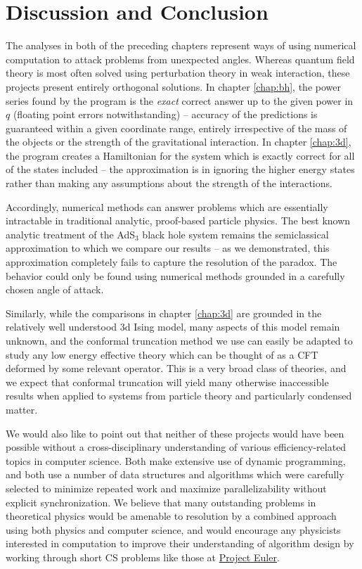 \chapter{Discussion and Conclusion}
\label{chap:conclusion}

The analyses in both of the preceding chapters represent ways of using numerical
computation to attack problems from unexpected angles. Whereas quantum field 
theory is most often solved using perturbation theory in weak interaction, these
projects present entirely orthogonal solutions. In chapter \ref{chap:bh}, the 
power series found by the program is the \emph{exact} correct answer up to 
the given power in $q$ (floating point errors notwithstanding) -- accuracy of 
the predictions is guaranteed within a given coordinate range, entirely 
irrespective of the mass of the objects or the strength of the gravitational 
interaction. In chapter \ref{chap:3d}, the program creates a Hamiltonian for the 
system which is exactly correct for all of the states included -- the 
approximation is in ignoring the higher energy states rather than making any 
assumptions about the strength of the interactions.

Accordingly, numerical methods can answer problems which are essentially 
intractable in traditional analytic, proof-based particle physics. The best
known analytic treatment of the AdS$_3$ black hole system remains the 
semiclassical approximation to which we compare our results -- as we 
demonstrated, this approximation completely fails to capture the resolution of
the paradox. The behavior could only be found using numerical methods grounded
in a carefully chosen angle of attack.

Similarly, while the comparisons in chapter \ref{chap:3d} are grounded in the 
relatively well understood 3d Ising model, many aspects of this model remain 
unknown, and the conformal truncation method we use can easily be adapted to 
study any low energy effective theory which can be thought of as a CFT deformed 
by some relevant operator. This is a very broad class of theories, and we expect 
that conformal truncation will yield many otherwise inaccessible results when 
applied to systems from particle theory and particularly condensed matter.

We would also like to point out that neither of these projects would have been
possible without a cross-disciplinary understanding of various 
efficiency-related topics in computer science. Both make extensive use of 
dynamic programming, and both use a number of data structures and algorithms 
which were carefully selected to minimize repeated work and maximize 
parallelizability without explicit synchronization. We believe that many
outstanding problems in theoretical physics would be amenable to resolution by
a combined approach using both physics and computer science, and would encourage
any physicists interested in computation to improve their understanding of 
algorithm design by working through short CS problems like those at 
\href{https://projecteuler.net}{Project Euler}.

